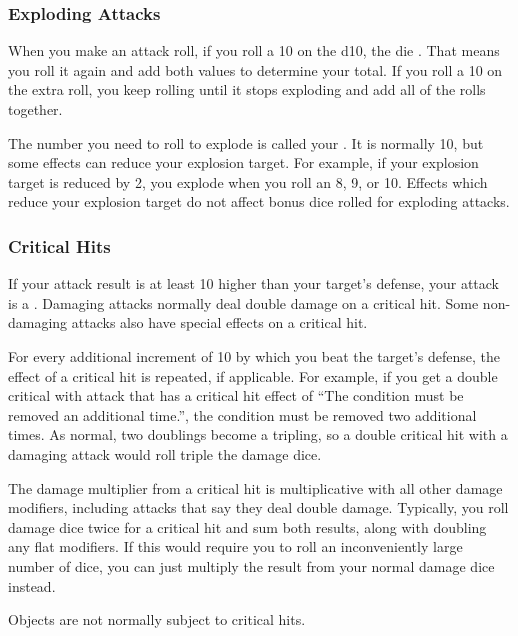         \subsubsection{Exploding Attacks}\label{Exploding Attacks}
            When you make an attack roll, if you roll a 10 on the d10, the die .
            That means you roll it again and add both values to determine your total.
            If you roll a 10 on the extra roll, you keep rolling until it stops exploding and add all of the rolls together.

            The number you need to roll to explode is called your .
            It is normally 10, but some effects can reduce your explosion target.
            For example, if your explosion target is reduced by 2, you explode when you roll an 8, 9, or 10.
            Effects which reduce your explosion target do not affect bonus dice rolled for exploding attacks.

        \subsubsection{Critical Hits}\label{Critical Hits}
            If your attack result is at least 10 higher than your target's defense, your attack is a .
            Damaging attacks normally deal double damage on a critical hit.
            Some non-damaging attacks also have special effects on a critical hit.

            For every additional increment of 10 by which you beat the target's defense, the effect of a critical hit is repeated, if applicable.
            For example, if you get a double critical with attack that has a critical hit effect of ``The condition must be removed an additional time.'', the condition must be removed two additional times.
            As normal, two doublings become a tripling, so a double critical hit with a damaging attack would roll triple the damage dice.

            The damage multiplier from a critical hit is multiplicative with all other damage modifiers, including attacks that say they deal double damage.
            Typically, you roll damage dice twice for a critical hit and sum both results, along with doubling any flat modifiers.
            If this would require you to roll an inconveniently large number of dice, you can just multiply the result from your normal damage dice instead.

            Objects are not normally subject to critical hits.

